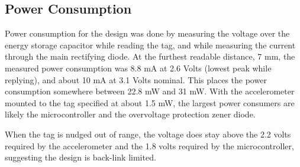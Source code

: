 \subsection{Power Consumption}
Power consumption for the design was done by measuring the voltage over the energy storage capacitor
while reading the tag, and while measuring the current through the main rectifying diode.
At the furthest readable distance, 7 mm, the measured power consumption was 8.8 mA at 2.6 Volts (lowest peak while replying),
and about 10 mA at 3.1 Volts nominal. This places the power consumption somewhere between 22.8 mW and 31 mW. With the
accelerometer mounted to the tag specified at about 1.5 mW, the largest power consumers are likely the microcontroller and the
overvoltage protection zener diode.

When the tag is nudged out of range, the voltage does stay above the 2.2 volts required by the accelerometer
and the 1.8 volts required by the microcontroller, suggesting the design is back-link limited.
